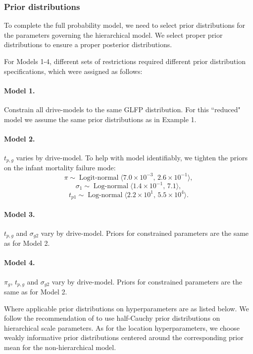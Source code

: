 \documentclass[aap]{imsart}
\newcommand{\op}{\operatorname}
\begin{document}
\subsubsection{Prior distributions}
\label{sec:Prior distributions}
To complete the full probability model, we need to select prior distributions for the parameters governing the hierarchical model. We select proper prior distributions to ensure a proper posterior distributions.

For Models 1-4, different sets of restrictions required different prior distribution specifications, which were assigned as follows:

\paragraph{Model 1.} Constrain all drive-models to the same GLFP distribution. For this ``reduced" model we assume the same prior distributions as in Example 1.

\paragraph{Model 2.} $t_{p,g}$ varies by drive-model. To help with model identifiably, we tighten the priors on the infant mortality failure mode:
$$ \pi \sim \op{Logit-normal}\langle 7.0\times 10^{-3},\, 2.6 \times 10^{-1} \rangle,$$
$$\sigma_1 \sim \op{Log-normal}\langle 1.4 \times 10^{-1},\, 7.1\rangle,$$ 
$$t_{p1} \sim \op{Log-normal} \langle 2.2 \times 10^1,\, 5.5 \times 10^{4} \rangle.$$

\paragraph{Model 3.} $t_{p,g}$ and $\sigma_{g2}$ vary by drive-model. Priors for constrained parameters are the same as for Model 2.

\paragraph{Model 4.} $\pi_g$, $t_{p,g}$ and $\sigma_{g2}$ vary by drive-model. Priors for constrained parameters are the same as for Model 2.


Where applicable prior distributions on hyperparameters are as listed below. We follow the recommendation of \citet{gelman2014bayesian} to use half-Cauchy prior distributions on hierarchical scale parameters. As for the location hyperparameters, we choose weakly informative prior distributions centered around the corresponding prior mean for the non-hierarchical model.
\end{document}
